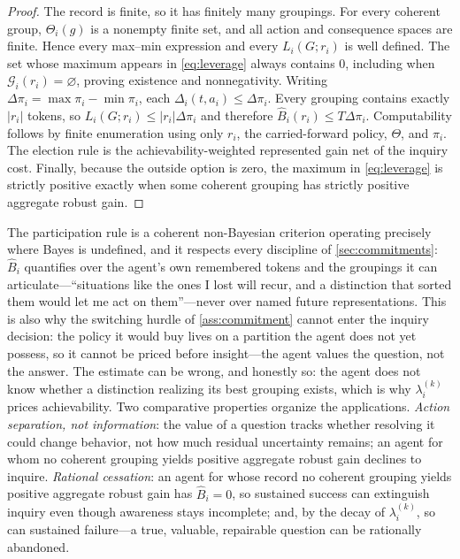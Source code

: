 \documentclass[11pt]{article}
\theoremstyle{definition}
\newcommand{\emptysetset}{\varnothing}
\begin{document}
\begin{proof}
The record is finite, so it has finitely many groupings.
For every coherent group, $\Theta_i(g)$ is a nonempty finite set, and all action and consequence spaces are finite.
Hence every max--min expression and every $L_i(G;r_i)$ is well defined.
The set whose maximum appears in \cref{eq:leverage} always contains $0$, including when $\mathcal G_i(r_i)=\emptysetset$, proving existence and nonnegativity.
Writing $\Delta \pi_i=\max \pi_i-\min \pi_i$, each $\Delta_i(t,a_i)\leq\Delta \pi_i$.
Every grouping contains exactly $\lvert r_i\rvert$ tokens, so $L_i(G;r_i)\leq\lvert r_i\rvert\Delta \pi_i$ and therefore $\widehat B_i(r_i)\leq T\Delta \pi_i$.
Computability follows by finite enumeration using only $r_i$, the carried-forward policy, $\Theta$, and $\pi_i$.
The election rule is the achievability-weighted represented gain net of the inquiry cost.
Finally, because the outside option is zero, the maximum in \cref{eq:leverage} is strictly positive exactly when some coherent grouping has strictly positive aggregate robust gain.
\end{proof}

The participation rule is a coherent non-Bayesian criterion operating precisely where Bayes is undefined, and it respects every discipline of \cref{sec:commitments}: $\widehat B_i$ quantifies over the agent's own remembered tokens and the groupings it can articulate---``situations like the ones I lost will recur, and a distinction that sorted them would let me act on them''---never over named future representations.
This is also why the switching hurdle of \cref{ass:commitment} cannot enter the inquiry decision: the policy it would buy lives on a partition the agent does not yet possess, so it cannot be priced before insight---the agent values the question, not the answer.
The estimate can be wrong, and honestly so: the agent does not know whether a distinction realizing its best grouping exists, which is why $\lambda_i^{(k)}$ prices achievability.
Two comparative properties organize the applications.
\emph{Action separation, not information}: the value of a question tracks whether resolving it could change behavior, not how much residual uncertainty remains; an agent for whom no coherent grouping yields positive aggregate robust gain declines to inquire.
\emph{Rational cessation}: an agent for whose record no coherent grouping yields positive aggregate robust gain has $\widehat B_i=0$, so sustained success can extinguish inquiry even though awareness stays incomplete; and, by the decay of $\lambda_i^{(k)}$, so can sustained failure---a true, valuable, repairable question can be rationally abandoned.
\end{document}
